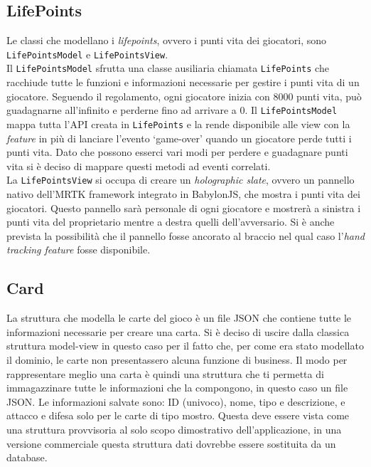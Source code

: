 \subsection{LifePoints}\label{subsec:lifepoints}
Le classi che modellano i \textit{lifepoints}, ovvero i punti vita dei giocatori, sono \texttt{LifePointsModel} e \texttt{LifePointsView}.\\
Il \texttt{LifePointsModel} sfrutta una classe ausiliaria chiamata \texttt{LifePoints} che racchiude tutte le funzioni e informazioni necessarie per gestire i punti vita di un giocatore.
Seguendo il regolamento, ogni giocatore inizia con 8000 punti vita, può guadagnarne all'infinito e perderne fino ad arrivare a 0. Il \texttt{LifePointsModel} mappa tutta l'API creata
in \texttt{LifePoints} e la rende disponibile alle view con la \textit{feature} in più di lanciare l'evento `game-over' quando un giocatore perde tutti i punti vita. Dato che possono
esserci vari modi per perdere e guadagnare punti vita si è deciso di mappare questi metodi ad eventi correlati.\\
La \texttt{LifePointsView} si occupa di creare un \textit{holographic slate}, ovvero un pannello nativo dell'MRTK framework integrato in BabylonJS, che mostra i punti vita dei giocatori.
Questo pannello sarà personale di ogni giocatore e mostrerà a sinistra i punti vita del proprietario mentre a destra quelli dell'avversario. Si è anche prevista la possibilità che il
pannello fosse ancorato al braccio nel qual caso l'\textit{hand tracking feature} fosse disponibile.\\

\subsection{Card}\label{subsec:card}
La struttura che modella le carte del gioco è un file JSON che contiene tutte le informazioni necessarie per creare una carta. Si è deciso di uscire dalla classica struttura model-view
in questo caso per il fatto che, per come era stato modellato il dominio, le carte non presentassero alcuna funzione di business. Il modo per rappresentare meglio una carta è quindi
una struttura che ti permetta di immagazzinare tutte le informazioni che la compongono, in questo caso un file JSON. Le informazioni salvate sono: ID (univoco), nome, tipo e descrizione,
e attacco e difesa solo per le carte di tipo mostro. Questa deve essere vista come una struttura provvisoria al solo scopo dimostrativo dell'applicazione, in una versione commerciale
questa struttura dati dovrebbe essere sostituita da un database.\\

